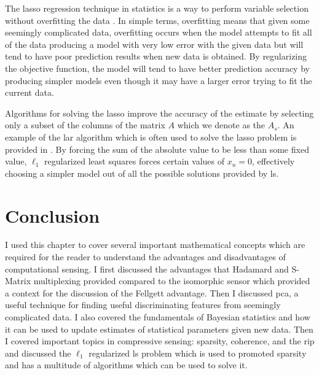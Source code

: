 The \gls{lasso} regression technique in statistics is a way to perform variable selection without overfitting the data \cite{tibshirani1996regression, james2013introduction}. In simple terms, overfitting means that given some seemingly complicated data, overfitting occurs when the model attempts to fit all of the data producing a model with very low error with the given data but will tend to have poor prediction results when new data is obtained. By regularizing the objective function, the model will tend to have better prediction accuracy by producing simpler models even though it may have a larger error trying to fit the current data.

Algorithms for solving the \gls{lasso} improve the accuracy of the estimate by selecting only a subset of the columns of the matrix $A$ which we denote as the $A_s$. An example of the \gls{lar} algorithm which is often used to solve the \gls{lasso} problem is provided in \cite{efron2004least}. By forcing the sum of the absolute value to be less than some fixed value, $\ell_1$ regularized least squares forces certain values of $x_n = 0$, effectively choosing a simpler model out of all the possible solutions provided by \gls{ls}. 

\section{Conclusion}

I used this chapter to cover several important mathematical concepts which are required for the reader to understand the advantages and disadvantages of computational sensing. I first discussed the advantages that Hadamard and S-Matrix multiplexing provided compared to the isomorphic sensor which provided a context for the discussion of the Fellgett advantage. Then I discussed \acrfull{pca}, a useful technique for finding useful discriminating features from seemingly complicated data. I also covered the fundamentals of Bayesian statistics and how it can be used to update estimates of statistical parameters given new data. Then I covered important topics in compressive sensing: sparsity, coherence, and the \acrfull{rip} and discussed the $\ell_1$ regularized \gls{ls} problem which is used to promoted sparsity and has a multitude of algorithms which can be used to solve it. 


%  
%



